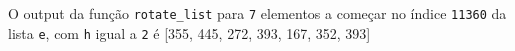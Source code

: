 \documentclass[12pt,varwidth=16cm,border=1pt]{standalone}
\begin{document}
O output da função \verb+rotate_list+ para \verb+7+ elementos a começar no índice \verb+11360+ da lista \verb+e+, com \verb+h+ igual a \verb+2+ é [355, 445, 272, 393, 167, 352, 393] 

\questiomfalse
\end{document}
